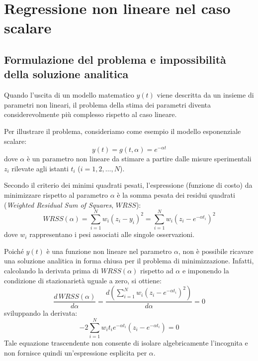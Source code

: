\section{Regressione non lineare nel caso scalare}

\subsection{Formulazione del problema e impossibilità della soluzione analitica}

Quando l'uscita di un modello matematico $y(t)$ viene descritta da un insieme di parametri non lineari, il problema della stima dei parametri diventa considerevolmente più complesso rispetto al caso lineare.

Per illustrare il problema, consideriamo come esempio il modello esponenziale scalare:
\begin{equation}
y(t) = g(t, \alpha) = e^{-\alpha t}
\end{equation}
dove $\alpha$ è un parametro non lineare da stimare a partire dalle misure sperimentali $z_{i}$ rilevate agli istanti $t_{i}$ ($i = 1, 2, \dots, N$).

Secondo il criterio dei minimi quadrati pesati, l'espressione (funzione di costo) da minimizzare rispetto al parametro $\alpha$ è la somma pesata dei residui quadrati (\textit{Weighted Residual Sum of Squares}, $WRSS$):
\begin{equation}
WRSS(\alpha) = \sum_{i=1}^{N} w_{i}(z_{i} - y_{i})^{2} = \sum_{i=1}^{N} w_{i}(z_{i} - e^{-\alpha t_{i}})^{2}
\end{equation}
dove $w_{i}$ rappresentano i pesi associati alle singole osservazioni.

Poiché $y(t)$ è una funzione non lineare nel parametro $\alpha$, non è possibile ricavare una soluzione analitica in forma chiusa per il problema di minimizzazione. Infatti, calcolando la derivata prima di $WRSS(\alpha)$ rispetto ad $\alpha$ e imponendo la condizione di stazionarietà uguale a zero, si ottiene:
\begin{equation}
\frac{d\,WRSS(\alpha)}{d\alpha} = \frac{d\left(\sum_{i=1}^{N} w_{i}(z_{i} - e^{-\alpha t_{i}})^{2}\right)}{d\alpha} = 0
\end{equation}
sviluppando la derivata:
\begin{equation}
-2 \sum_{i=1}^{N} w_{i} t_{i} e^{-\alpha t_{i}} (z_{i} - e^{-\alpha t_{i}}) = 0
\end{equation}
Tale equazione trascendente non consente di isolare algebricamente l'incognita e non fornisce quindi un'espressione esplicita per $\alpha$.

